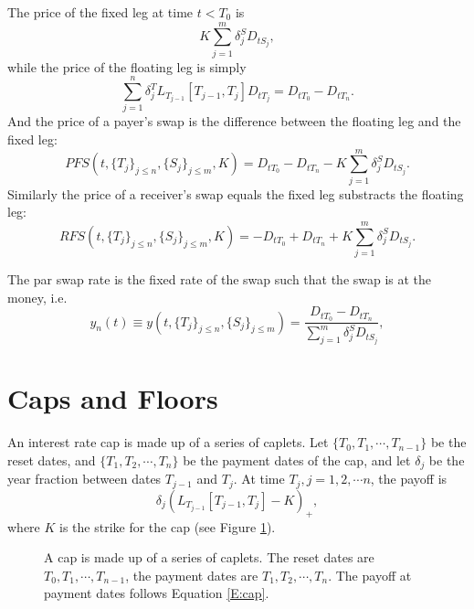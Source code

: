 The price of the fixed leg at time $t<T_0$ is
\[
  K \sum_{j=1}^m \delta^S_j D_{tS_j},
\]
while the price of the floating leg is simply
\[
  \sum_{j=1}^n \delta^T_j L_{T_{j-1}}[T_{j-1},T_j] D_{tT_j}
    = D_{tT_0} - D_{tT_n}.
\]
And the price of a payer's swap is the difference between the floating leg and
the fixed leg:
\begin{equation}
  PFS(t,\{T_j\}_{j\le n},\{S_j\}_{j\le m},K)
    = D_{tT_0} - D_{tT_n} - K\sum_{j=1}^m \delta^S_j D_{tS_j}.
\end{equation}
Similarly the price of a receiver's swap equals the fixed leg substracts the
floating leg:
\begin{equation}
  RFS(t,\{T_j\}_{j\le n},\{S_j\}_{j\le m},K)
    = -D_{tT_0} + D_{tT_n} + K\sum_{j=1}^m \delta^S_j D_{tS_j}.
\end{equation}


The par swap rate is the fixed rate of the swap such that the swap is at the 
money, i.e.
\begin{equation} \label{E:swap}
  y_n(t) \equiv y(t,\{T_j\}_{j\le n},\{S_j\}_{j\le m}) 
    = \frac{ D_{tT_0} - D_{tT_n} }{ \sum_{j=1}^m \delta^S_j D_{tS_j} },
\end{equation}


\section{Caps and Floors}
An interest rate cap is made up of a series of caplets. 
Let $\{T_0,T_1,\cdots,T_{n-1}\}$ be the reset dates, and
$\{T_1,T_2,\cdots,T_{n}\}$ be the payment dates of the cap, 
and let $\delta_{j}$ be the year fraction between dates $T_{j-1}$ and $T_j$.
At time $T_j,j=1,2,\cdots n$, the payoff is
\begin{equation} \label{E:cap}
  \delta_j \left( L_{T_{j-1}}[T_{j-1},T_j] - K \right)_+,
\end{equation}
where $K$ is the strike for the cap (see Figure \ref{F:cap}).

\begin{figure}
  \caption{A cap is made up of a series of caplets.
    The reset dates are $T_0,T_1,\cdots,T_{n-1}$, the payment dates are
    $T_1,T_2,\cdots,T_{n}$. The payoff at payment dates follows 
    Equation \ref{E:cap}.}
  \label{F:cap}
\end{figure}

